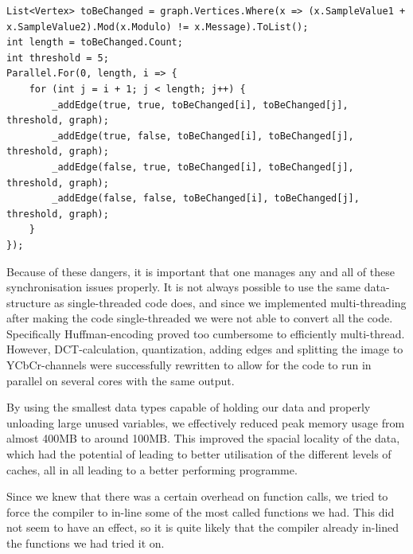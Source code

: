 \begin{lstlisting}[firstnumber=677,label=lst:parallelEdgeAdding, caption={Parallelisation of the algorithm for adding edges to the graph. \textbf{File:} third\textunderscore  round/JPEGImage.cs.}]
List<Vertex> toBeChanged = graph.Vertices.Where(x => (x.SampleValue1 + x.SampleValue2).Mod(x.Modulo) != x.Message).ToList();
int length = toBeChanged.Count;
int threshold = 5;
Parallel.For(0, length, i => {
    for (int j = i + 1; j < length; j++) {
        _addEdge(true, true, toBeChanged[i], toBeChanged[j], threshold, graph);
        _addEdge(true, false, toBeChanged[i], toBeChanged[j], threshold, graph);
        _addEdge(false, true, toBeChanged[i], toBeChanged[j], threshold, graph);
        _addEdge(false, false, toBeChanged[i], toBeChanged[j], threshold, graph);
    }
});
\end{lstlisting}

\FloatBarrier

Because of these dangers, it is important that one manages any and all of these synchronisation issues properly.
It is not always possible to use the same data-structure as single-threaded code does, and since we implemented multi-threading after making the code single-threaded we were not able to convert all the code.
Specifically Huffman-encoding proved too cumbersome to efficiently multi-thread.
However, DCT-calculation, quantization, adding edges and splitting the image to YCbCr-channels were successfully rewritten to allow for the code to run in parallel on several cores with the same output.

By using the smallest data types capable of holding our data and properly unloading large unused variables, we effectively reduced peak memory usage from almost 400MB to around 100MB.
This improved the spacial locality of the data, which had the potential of leading to better utilisation of the different levels of caches, all in all leading to a better performing programme.

Since we knew that there was a certain overhead on function calls, we tried to force the compiler to in-line some of the most called functions we had. 
This did not seem to have an effect, so it is quite likely that the compiler already in-lined the functions we had tried it on.

